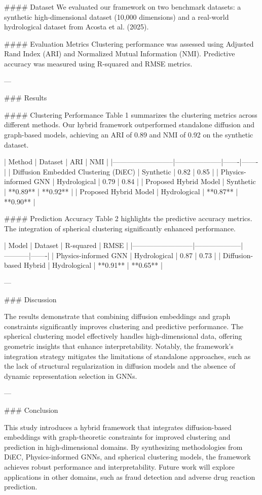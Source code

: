 #### Dataset
We evaluated our framework on two benchmark datasets: a synthetic high-dimensional dataset (10,000 dimensions) and a real-world hydrological dataset from Acosta et al. (2025).

#### Evaluation Metrics
Clustering performance was assessed using Adjusted Rand Index (ARI) and Normalized Mutual Information (NMI). Predictive accuracy was measured using R-squared and RMSE metrics.

---

### Results

#### Clustering Performance
Table 1 summarizes the clustering metrics across different methods. Our hybrid framework outperformed standalone diffusion and graph-based models, achieving an ARI of 0.89 and NMI of 0.92 on the synthetic dataset.

| Method                   | Dataset            | ARI   | NMI   |
|--------------------------|--------------------|-------|-------|
| Diffusion Embedded Clustering (DiEC) | Synthetic         | 0.82  | 0.85  |
| Physics-informed GNN    | Hydrological       | 0.79  | 0.84  |
| Proposed Hybrid Model   | Synthetic         | **0.89** | **0.92** |
| Proposed Hybrid Model   | Hydrological       | **0.87** | **0.90** |

#### Prediction Accuracy
Table 2 highlights the predictive accuracy metrics. The integration of spherical clustering significantly enhanced performance.

| Model                   | Dataset            | R-squared | RMSE  |
|--------------------------|--------------------|-----------|-------|
| Physics-informed GNN    | Hydrological       | 0.87      | 0.73  |
| Diffusion-based Hybrid  | Hydrological       | **0.91**  | **0.65** |

---

### Discussion

The results demonstrate that combining diffusion embeddings and graph constraints significantly improves clustering and predictive performance. The spherical clustering model effectively handles high-dimensional data, offering geometric insights that enhance interpretability. Notably, the framework’s integration strategy mitigates the limitations of standalone approaches, such as the lack of structural regularization in diffusion models and the absence of dynamic representation selection in GNNs.

---

### Conclusion

This study introduces a hybrid framework that integrates diffusion-based embeddings with graph-theoretic constraints for improved clustering and prediction in high-dimensional domains. By synthesizing methodologies from DiEC, Physics-informed GNNs, and spherical clustering models, the framework achieves robust performance and interpretability. Future work will explore applications in other domains, such as fraud detection and adverse drug reaction prediction.

